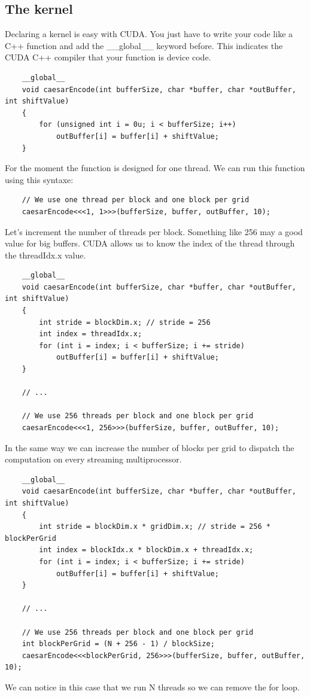 \documentclass{article}
\begin{document}
\subsection{The kernel}
	Declaring a kernel is easy with CUDA. You just have to write your code like a C++ function and add the \_\_global\_\_ keyword before. This indicates the CUDA C++ compiler that your function is device code. 
\begin{lstlisting}
	__global__
	void caesarEncode(int bufferSize, char *buffer, char *outBuffer, int shiftValue)
	{
		for (unsigned int i = 0u; i < bufferSize; i++)
			outBuffer[i] = buffer[i] + shiftValue;
	}
\end{lstlisting}
For the moment the function is designed for one thread. We can run this function using this syntaxe:
\begin{lstlisting}
	// We use one thread per block and one block per grid
	caesarEncode<<<1, 1>>>(bufferSize, buffer, outBuffer, 10);
\end{lstlisting}
Let's increment the number of threads per block. Something like 256 may a good value for big buffers. CUDA allows us to know the index of the thread through the threadIdx.x value. 

\begin{lstlisting}
	__global__
	void caesarEncode(int bufferSize, char *buffer, char *outBuffer, int shiftValue)
	{
		int stride = blockDim.x; // stride = 256
		int index = threadIdx.x;
		for (int i = index; i < bufferSize; i += stride)
			outBuffer[i] = buffer[i] + shiftValue;
	}
	
	// ...

	// We use 256 threads per block and one block per grid
	caesarEncode<<<1, 256>>>(bufferSize, buffer, outBuffer, 10);
\end{lstlisting}

In the same way we can increase the number of blocks per grid to dispatch the computation on every streaming multiprocessor.
\begin{lstlisting}
	__global__
	void caesarEncode(int bufferSize, char *buffer, char *outBuffer, int shiftValue)
	{
		int stride = blockDim.x * gridDim.x; // stride = 256 * blockPerGrid
		int index = blockIdx.x * blockDim.x + threadIdx.x;
		for (int i = index; i < bufferSize; i += stride)
			outBuffer[i] = buffer[i] + shiftValue;
	}
	
	// ...

	// We use 256 threads per block and one block per grid
	int blockPerGrid = (N + 256 - 1) / blockSize;
	caesarEncode<<<blockPerGrid, 256>>>(bufferSize, buffer, outBuffer, 10);
\end{lstlisting}
We can notice in this case that we run N threads so we can remove the for loop.
\end{document}
